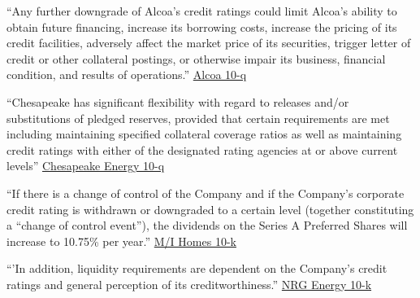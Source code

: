 \documentclass[a4paper, 12pt]{article}
\begin{document}
\begin{displayquote}
\begin{small}
\begin{singlespace}
``Any further downgrade of Alcoa's credit ratings could limit Alcoa's ability to obtain future financing, increase its borrowing costs, increase the pricing of its credit facilities, adversely affect the market price of its securities, trigger letter of credit or other collateral postings, or otherwise impair its business, financial condition, and results of operations.''
\href{https://www.sec.gov/Archives/edgar/data/4281/000119312513404066/d593859d10q.htm}{Alcoa 10-q}
\end{singlespace}
\end{small}
\end{displayquote}

\begin{displayquote}
\begin{small}
\begin{singlespace}
``Chesapeake has significant flexibility with regard to releases and/or substitutions of pledged reserves, provided that certain requirements are met including maintaining specified collateral coverage ratios as well as maintaining credit ratings with either of the designated rating agencies at or above current levels'' \href{https://www.sec.gov/Archives/edgar/data/895126/000089512613000254/chk-2013063010xq.htm}{Chesapeake Energy 10-q}


\end{singlespace}
\end{small}
\end{displayquote}


\begin{displayquote}
\begin{small}
\begin{singlespace}
``If there is a change of control of the Company and if the Company’s corporate credit rating is withdrawn or downgraded to a certain level (together constituting a “change of control event”), the dividends on the Series A Preferred Shares will increase to 10.75\% per year.'' \href{https://www.sec.gov/Archives/edgar/data/799292/000079929215000009/mho-20141231x10k.htm}{M/I Homes 10-k}
\end{singlespace}
\end{small}
\end{displayquote}


\begin{displayquote}
\begin{small}
\begin{singlespace}
``'In addition, liquidity requirements are dependent on the Company's credit ratings and general perception of its creditworthiness.''
\href{https://www.sec.gov/Archives/edgar/data/1013871/000101387114000003/a201310-k.htm}{NRG Energy 10-k}
\end{singlespace}
\end{small}
\end{displayquote}
\end{document}
